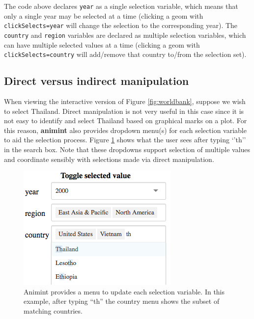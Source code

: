 \documentclass[12pt,]{article}
\newenvironment{Shaded}{\begin{snugshade}}{\end{snugshade}}
\newcommand{\DataTypeTok}[1]{\textcolor[rgb]{0.13,0.29,0.53}{#1}}
\newcommand{\KeywordTok}[1]{\textcolor[rgb]{0.13,0.29,0.53}{\textbf{#1}}}
\newcommand{\NormalTok}[1]{#1}
\newcommand{\OperatorTok}[1]{\textcolor[rgb]{0.81,0.36,0.00}{\textbf{#1}}}
\newcommand{\StringTok}[1]{\textcolor[rgb]{0.31,0.60,0.02}{#1}}
\theoremstyle{definition}
\theoremstyle{definition}
\theoremstyle{definition}
\theoremstyle{remark}
\begin{document}
\begin{Shaded}
\end{Shaded}

The code above declares \texttt{year} as a single selection variable,
which means that only a single year may be selected at a time (clicking
a geom with \texttt{clickSelects=year} will change the selection to the
corresponding year). The \texttt{country} and \texttt{region} variables
are declared as multiple selection variables, which can have multiple
selected values at a time (clicking a geom with
\texttt{clickSelects=country} will add/remove that country to/from the
selection set).

\hypertarget{direction}{%
\subsection{Direct versus indirect manipulation}\label{direction}}

When viewing the interactive version of Figure \ref{fig:worldbank},
suppose we wish to select Thailand. Direct manipulation is not very
useful in this case since it is not easy to identify and select Thailand
based on graphical marks on a plot. For this reason, \textbf{animint}
also provides dropdown menu(s) for each selection variable to aid the
selection process. Figure \ref{fig:widgets} shows what the user sees
after typing `'th'' in the search box. Note that these dropdowns support
selection of multiple values and coordinate sensibly with selections
made via direct manipulation.

\begin{figure}
\centering
\includegraphics{images/dropdown}
\caption{\label{fig:widgets}Animint provides a menu to update each selection
variable. In this example, after typing ``th'' the country menu shows
the subset of matching countries.}
\end{figure}
\end{document}
